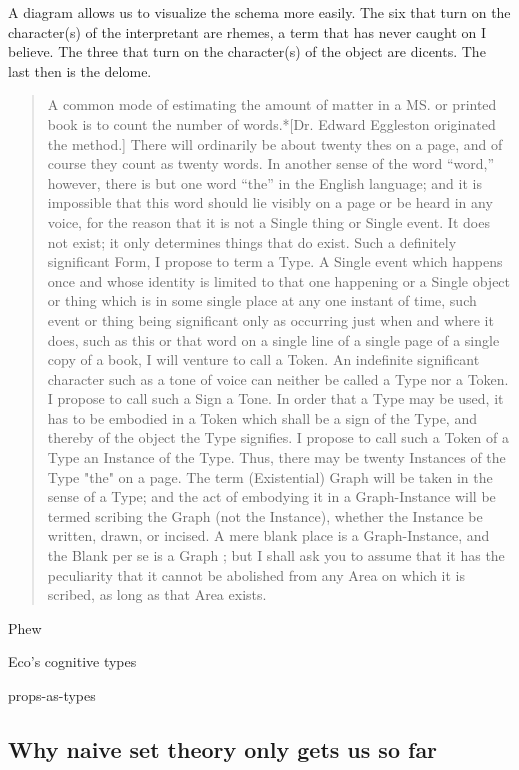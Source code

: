 \documentclass[dah,phd,a4paper]{xe_uccthesis}
\begin{document}
A diagram allows us to visualize the schema more easily. The six that turn on the character(s) of the interpretant are rhemes, a term that has never caught on I believe. The three that turn on the character(s) of the object are dicents. The last then is the delome.

\begin{quotation}
A common mode of estimating the amount of matter in a MS. or printed book is to count the number of words.*[Dr. Edward Eggleston originated the method.] There will ordinarily be about twenty thes on a page, and of course they count as twenty words. In another sense of the word “word,” however, there is but one word “the” in the English language; and it is impossible that this word should lie visibly on a page or be heard in any voice, for the reason that it is not a Single thing or Single event. It does not exist; it only determines things that do exist. Such a definitely significant Form, I propose to term a Type. A Single event which happens once and whose identity is limited to that one happening or a Single object or thing which is in some single place at any one instant of time, such event or thing being significant only as occurring just when and where it does, such as this or that word on a single line of a single page of a single copy of a book, I will venture to call a Token. An indefinite significant character such as a tone of voice can neither be called a Type nor a Token. I propose to call such a Sign a Tone. In order that a Type may be used, it has to be embodied in a Token which shall be a sign of the Type, and thereby of the object the Type signifies. I propose to call such a Token of a Type an Instance of the Type. Thus, there may be twenty Instances of the Type "the" on a page. The term (Existential) Graph will be taken in the sense of a Type; and the act of embodying it in a Graph-Instance will be termed scribing the Graph (not the Instance), whether the Instance be written, drawn, or incised. A mere blank place is a Graph-Instance, and the Blank per se is a Graph ; but I shall ask you to assume that it has the peculiarity that it cannot be abolished from any Area on which it is scribed, as long as that Area exists.
\end{quotation}

Phew

Eco's cognitive types\citep{eco_kant_2000}

props-as-types\citep{wadler_propositions_2014}

\subsection{Why naive set theory only gets us so far}
\end{document}

